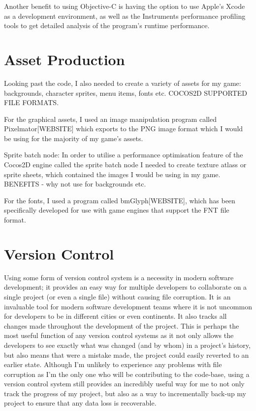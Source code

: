 \documentclass[a4paper,oneside]{report}
\begin{document}
Another benefit to using Objective-C is having the option to use Apple's Xcode as a development environment, as well as the Instruments performance profiling tools to get detailed analysis of the program's runtime performance.

\section{Asset Production}

Looking past the code, I also needed to create a variety of assets for my game: backgrounds, character sprites, menu items, fonts etc. COCOS2D SUPPORTED FILE FORMATS. 

For the graphical assets, I used an image manipulation program called Pixelmator[WEBSITE] which exports to the PNG image format which I would be using for the majority of my game's assets. 

Sprite batch node: In order to utilise a performance optimisation feature of the Cocos2D engine called the sprite batch node I needed to create texture atlass or sprite sheets, which contained the images I would be using in my game. BENEFITS - why not use for backgrounds etc.

For the fonts, I used a program called bmGlyph[WEBSITE], which has been specifically developed for use with game engines that support the FNT file format.

\section{Version Control}

Using some form of version control system is a necessity in modern software development; it provides an easy way for multiple developers to collaborate on a single project (or even a single file) without causing file corruption. It is an invaluable tool for modern software development teams where it is not uncommon for developers to be in different cities or even continents. It also tracks all changes made throughout the development of the project. This is perhaps the most useful function of any version control systems as it not only allows the developers to see exactly what was changed (and by whom) in a project's history, but also means that were a mistake made, the project could easily reverted to an earlier state. Although I'm unlikely to experience any problems with file corruption as I'm the only one who will be contributing to the code-base, using a version control system still provides an incredibly useful way for me to not only track the progress of my project, but also as a way to incrementally back-up my project to ensure that any data loss is recoverable.
\end{document}
